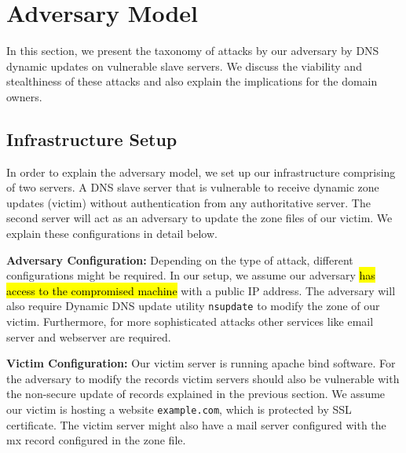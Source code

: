 \section{Adversary Model}

In this section, we present the taxonomy of attacks by our adversary by DNS dynamic updates on vulnerable slave servers. We discuss the viability and stealthiness of these attacks and also explain the implications for the domain owners.


\subsection{Infrastructure Setup}

In order to explain the adversary model, we set up our infrastructure comprising of two servers. A DNS slave server that is vulnerable to receive  dynamic zone updates (victim) without authentication from any authoritative server. The second server will act as an adversary to update the zone files of our victim.  We explain these configurations in detail below. 


\textbf{Adversary Configuration:} Depending on the type of attack, different configurations might be required. In our setup, we assume our adversary \hl{has access to the compromised machine}  with a public IP address. The adversary will also require Dynamic DNS update utility \texttt{nsupdate} to modify the zone of our victim. Furthermore, for more sophisticated attacks other services like email server and webserver are required. %

\textbf{Victim Configuration:} Our victim server is running apache bind software. For the adversary to modify the records victim servers should also be vulnerable with the non-secure update of records explained in the previous section. We assume our victim is hosting a website \texttt{example.com}, which is protected by SSL certificate. The victim server might also have a mail server configured with the mx record configured in the zone file.  

